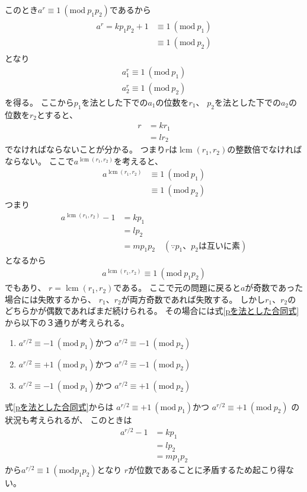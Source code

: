 \documentclass[a4paper, 10pt]{jsarticle}
\DeclareMathOperator{\lcm}{lcm}
\begin{document}
このとき$a^r \equiv 1 \ (\mathrm{mod} \ p_1 p_2)$であるから
\begin{align}
	\begin{aligned}
		a^r = kp_1 p_2 + 1 &\equiv 1 \ (\mathrm{mod} \ p_1) \\
		&\equiv 1 \ (\mathrm{mod} \ p_2)
	\end{aligned}
	\label{pを法とした合同式}
\end{align}
となり
\begin{gather}
	a_1^r \equiv 1 \ (\mathrm{mod} \ p_1) \\
	a_2^r \equiv 1 \ (\mathrm{mod} \ p_2)
\end{gather}
を得る。
ここから$p_1$を法とした下での$a_1$の位数を$r_1$、
$p_2$を法とした下での$a_2$の位数を$r_2$とすると、
\begin{align}
	r &= k r_1 \\
	&= l r_2
\end{align}
でなければならないことが分かる。
つまり$r$は$\lcm (r_1, r_2)$の整数倍でなければならない。
ここで$a^{\lcm (r_1, r_2)}$を考えると、
\begin{align}
	a^{\lcm (r_1, r_2)} &\equiv 1 \ (\mathrm{mod} \ p_1) \\
	&\equiv 1 \ (\mathrm{mod} \ p_2)
\end{align}
つまり
\begin{align}
	a^{\lcm (r_1, r_2)} - 1 &= k p_1\\
	&= lp_2 \\
	&= mp_1 p_2 \quad (\because \text{$p_1$、$p_2$は互いに素})
\end{align}
となるから
\begin{align}
	a^{\lcm (r_1, r_2)} \equiv 1 \ (\mathrm{mod} \ p_1 p_2)
\end{align}
でもあり、
$r = \lcm (r_1, r_2)$である。
ここで元の問題に戻ると$a$が奇数であった場合には失敗するから、
$r_1$、$r_2$が両方奇数であれば失敗する。
しかし$r_1$、$r_2$のどちらかが偶数であればまだ続けられる。
その場合には式\eqref{pを法とした合同式}から以下の３通りが考えられる。
\begin{enumerate}
	\item $a^{r/2} \equiv -1 \ (\mathrm{mod} \ p_1)$かつ
	$a^{r/2} \equiv -1 \ (\mathrm{mod} \ p_2)$
	\label{両方-1}
	\item $a^{r/2} \equiv +1 \ (\mathrm{mod} \ p_1)$かつ
	$a^{r/2} \equiv -1 \ (\mathrm{mod} \ p_2)$
	\label{p1では1}
	\item $a^{r/2} \equiv -1 \ (\mathrm{mod} \ p_1)$かつ
	$a^{r/2} \equiv +1 \ (\mathrm{mod} \ p_2)$
	\label{p2では1}
\end{enumerate}
式\eqref{pを法とした合同式}からは
$a^{r/2} \equiv +1 \ (\mathrm{mod} \ p_1)$かつ
$a^{r/2} \equiv +1 \ (\mathrm{mod} \ p_2)$
の状況も考えられるが、
このときは
\begin{align}
	a^{r/2} - 1 &= kp_1 \\
	&= lp_2 \\
	&= m p_1 p_2
\end{align}
から$a^{r/2} \equiv 1 \ (\mathrm{mod} p_1 p_2)$となり
$r$が位数であることに矛盾するため起こり得ない。
\end{document}
